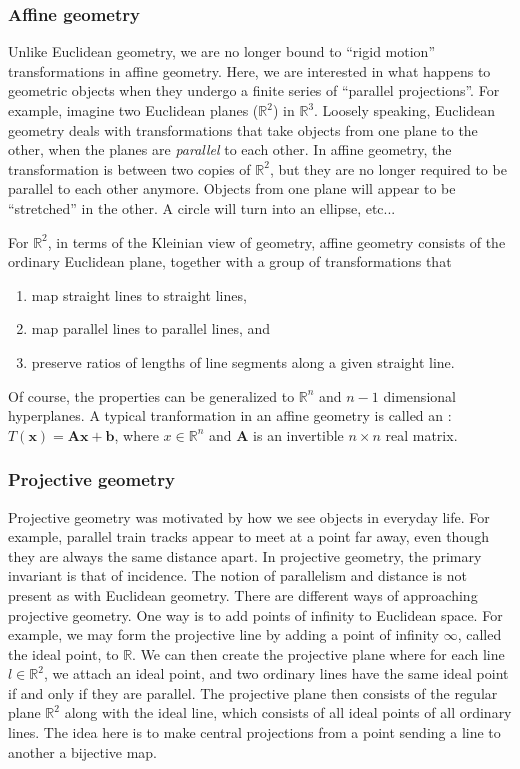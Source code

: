 \documentclass[12pt]{article}
\begin{document}
\subsubsection{Affine geometry} 
 Unlike Euclidean geometry, we are no longer bound to ``rigid motion''
transformations in affine geometry.  Here, we are interested in what
happens to geometric objects when they undergo a finite series of
``parallel projections''.  For example, imagine two Euclidean planes
($\mathbb{R}^2$) in $\mathbb{R}^3$.  Loosely speaking, Euclidean
geometry deals with transformations that take objects from one plane
to the other, when the planes are \emph{parallel} to each other.  In
affine geometry, the transformation is between two copies of
$\mathbb{R}^2$, but they are no longer required to be parallel to each
other anymore.  Objects from one plane will appear to be ``stretched''
in the other.  A circle will turn into an ellipse, etc...

For $\mathbb{R}^2$, in terms of the Kleinian view of geometry, affine
geometry consists of the ordinary Euclidean plane, together with a
group of transformations that
\begin{enumerate}
\item map straight lines to straight lines,
\item map parallel lines to parallel lines, and
\item preserve ratios of lengths of line segments along a given
straight line.  
\end{enumerate}
Of course, the properties can be generalized to $\mathbb{R}^n$ and
$n-1$ dimensional hyperplanes.  A typical tranformation in an affine
geometry is called an :
$T(\boldsymbol{x})=\boldsymbol{Ax}+\boldsymbol{b}$, where
$x\in\mathbb{R}^n$ and $\boldsymbol{A}$ is an invertible $n\times n$
real matrix.

\subsubsection{Projective geometry}
Projective geometry was motivated by how we see objects in everyday
life. For example, parallel train tracks appear to meet at a point far
away, even though they are always the same distance apart. In
projective geometry, the primary invariant is that of incidence. The
notion of parallelism and distance is not present as with Euclidean
geometry. There are different ways of approaching projective
geometry. One way is to add points of infinity to Euclidean space. For
example, we may form the projective line by adding a point of infinity
$\infty$, called the ideal point, to $\mathbb{R}$. We can then create
the projective plane where for each line $l \in \mathbb{R}^2$, we
attach an ideal point, and two ordinary lines have the same ideal
point if and only if they are parallel. The projective plane then
consists of the regular plane $\mathbb{R}^2$ along with the ideal
line, which consists of all ideal points of all ordinary lines. The
idea here is to make central projections from a point sending a line
to another a bijective map.
\end{document}
